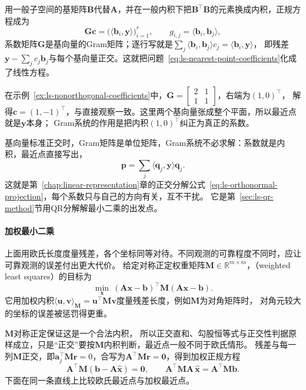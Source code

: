 用一般子空间的基矩阵$\bm B$代替$\bm A$，并在一般内积下把$\bm B^\top\bm B$的元素换成内积，正规方程成为
\begin{equation}
 \bm G\bm c=\bigl(\langle\bm b_i,\bm y\rangle\bigr)_{i=1}^r,\qquad
 g_{i,j}=\langle\bm b_i,\bm b_j\rangle,
 \label{eq:ls-gram-system}
\end{equation}
系数矩阵$\bm G$是基向量的Gram矩阵；逐行写就是$\sum_j\langle\bm b_i,\bm b_j\rangle c_j=\langle\bm b_i,\bm y\rangle$，
即残差$\bm y-\sum_jc_j\bm b_j$与每个基向量正交。这就把问题~\eqref{eq:ls-nearest-point-coefficients}化成了线性方程。

在示例~\ref{ex:ls-nonorthogonal-coefficients}中，$\bm G=\left[\begin{smallmatrix}2&1\\1&1\end{smallmatrix}\right]$，右端为$(1,0)^\top$，
解得$\bm c=(1,-1)^\top$，与直接观察一致。这里两个基向量张成整个平面，所以最近点就是$\bm y$本身；
Gram系统的作用是把内积$(1,0)^\top$纠正为真正的系数。

基向量标准正交时，Gram矩阵是单位矩阵，Gram系统不必求解：系数就是内积，最近点直接写出，
\[
 \bm p=\sum_j\langle\bm q_j,\bm y\rangle\bm q_j .
\]
这就是第~\ref{chap:linear-representation}章的正交分解公式~\eqref{eq:ls-orthonormal-projection}，每个系数只与自己的方向有关，互不干扰。
它是第~\ref{sec:ls-qr-method}节用QR分解解最小二乘的出发点。

\paragraph{加权最小二乘}
\label{sec:ls-weighted-ls}
\label{sec:ls-weighted-regularized-solve}

上面用欧氏长度度量残差，各个坐标同等对待。不同观测的可靠程度不同时，应让可靠观测的误差付出更大代价。
给定对称正定权重矩阵$\bm M\in\mathbb R^{m\times m}$，（weighted least squares）的目标为
\begin{equation}
 \min_{\bm x}\ (\bm A\bm x-\bm b)^\top\bm M(\bm A\bm x-\bm b).
 \label{eq:ls-weighted-objective}
\end{equation}
它用加权内积$\langle\bm u,\bm v\rangle_{\bm M}=\bm u^\top\bm M\bm v$度量残差长度，例如$\bm M$为对角矩阵时，
对角元较大的坐标的误差被惩罚得更重。

$\bm M$对称正定保证这是一个合法内积，
所以正交直和、勾股恒等式与正交性判据原样成立，只是“正交”要按$\bm M$内积判断，最近点一般不同于欧氏情形。
残差与每一列$\bm M$正交，即$\bm a_j^\top\bm M\bm r=0$，合写为$\bm A^\top\bm M\bm r=\bm0$，得到加权正规方程
\begin{equation}
 \bm A^\top\bm M(\bm b-\bm A\hat{\bm x})=\bm0,
 \qquad
 \bm A^\top\bm M\bm A\,\hat{\bm x}=\bm A^\top\bm M\bm b.
 \label{eq:linear-algebra-weighted-normal-equations}
\end{equation}
下面在同一条直线上比较欧氏最近点与加权最近点。

